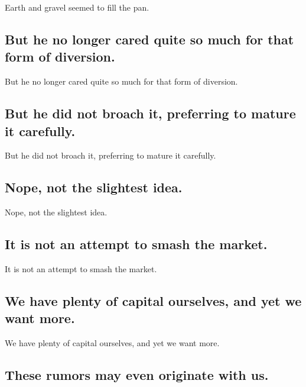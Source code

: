 \documentclass[]{article}
\begin{document}
Earth and gravel seemed to fill the pan.

\hypertarget{but-he-no-longer-cared-quite-so-much-for-that-form-of-diversion.}{%
\subsection{But he no longer cared quite so much for that form of
diversion.}\label{but-he-no-longer-cared-quite-so-much-for-that-form-of-diversion.}}

But he no longer cared quite so much for that form of diversion.

\hypertarget{but-he-did-not-broach-it-preferring-to-mature-it-carefully.}{%
\subsection{But he did not broach it, preferring to mature it
carefully.}\label{but-he-did-not-broach-it-preferring-to-mature-it-carefully.}}

But he did not broach it, preferring to mature it carefully.

\hypertarget{nope-not-the-slightest-idea.}{%
\subsection{Nope, not the slightest
idea.}\label{nope-not-the-slightest-idea.}}

Nope, not the slightest idea.

\hypertarget{it-is-not-an-attempt-to-smash-the-market.}{%
\subsection{It is not an attempt to smash the
market.}\label{it-is-not-an-attempt-to-smash-the-market.}}

It is not an attempt to smash the market.

\hypertarget{we-have-plenty-of-capital-ourselves-and-yet-we-want-more.}{%
\subsection{We have plenty of capital ourselves, and yet we want
more.}\label{we-have-plenty-of-capital-ourselves-and-yet-we-want-more.}}

We have plenty of capital ourselves, and yet we want more.

\hypertarget{these-rumors-may-even-originate-with-us.}{%
\subsection{These rumors may even originate with
us.}\label{these-rumors-may-even-originate-with-us.}}
\end{document}
